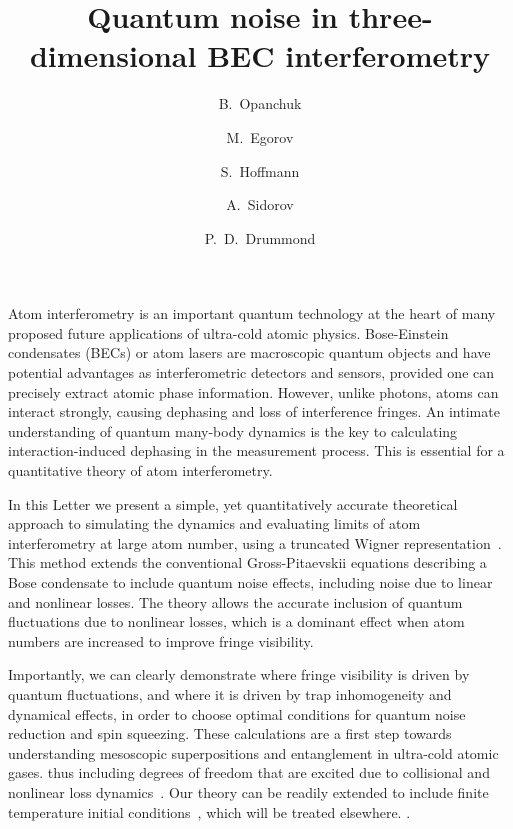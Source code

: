 \documentclass[doublecol]{epl2}
\title{Quantum noise in three-dimensional BEC interferometry}
\author{B.~Opanchuk\inst{1} \and M.~Egorov\inst{1} \and S.~Hoffmann\inst{2} \and A.~Sidorov\inst{1} \and P.~D.~Drummond\inst{1}}
\institute{
  \inst{1} Centre for Atom Optics and Ultrafast Spectroscopy, Swinburne University of Technology, Hawthorn, VIC 3122, Australia \\
  \inst{2} Physics Department, University of Queensland, Queensland, Australia
}
\begin{document}
\maketitle

Atom interferometry is an important quantum technology
at the heart of many proposed future applications of ultra-cold atomic physics.
Bose-Einstein condensates (BECs) or atom lasers are macroscopic quantum objects and have potential advantages as interferometric detectors and sensors,
provided one can precisely extract atomic phase information.
However, unlike photons, atoms can interact strongly, causing dephasing and loss of interference fringes.
An intimate understanding of quantum many-body dynamics is the key to calculating
interaction-induced dephasing in the measurement process.
This is essential for a quantitative theory of atom interferometry.

In this Letter we present a simple, yet quantitatively accurate theoretical approach
to simulating the dynamics and evaluating limits of atom interferometry at large atom number,
using a truncated Wigner representation~\cite{Drummond1993,Steel1998,Sinatra2002}.
This method extends the conventional Gross-Pitaevskii equations
describing a Bose condensate to include quantum noise effects,
including noise due to linear and nonlinear losses.
The theory allows the accurate inclusion of quantum fluctuations due to nonlinear losses,
which is a dominant effect when atom numbers are increased to improve fringe visibility.

Importantly, we can clearly demonstrate where fringe visibility is driven by quantum fluctuations,
and where it is driven by trap inhomogeneity and dynamical effects,
in order to choose optimal conditions for quantum noise reduction and spin squeezing.
These calculations are a first step towards understanding mesoscopic superpositions and entanglement in ultra-cold atomic gases.
thus including degrees of freedom that are excited due to
collisional and nonlinear loss dynamics~\cite{Norrie2005,Deuar2007}.
Our theory can be readily extended to include finite temperature initial conditions~\cite{Steel1998,Isella2006},
which will be treated elsewhere.
.
\end{document}
